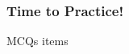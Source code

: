 \begin{{frame}}
    \frametitle{{Time to Practice!}}
    \begin{{itemize}}
        \item MCQs
        {items}
    \end{{itemize}}
\end{{frame}}